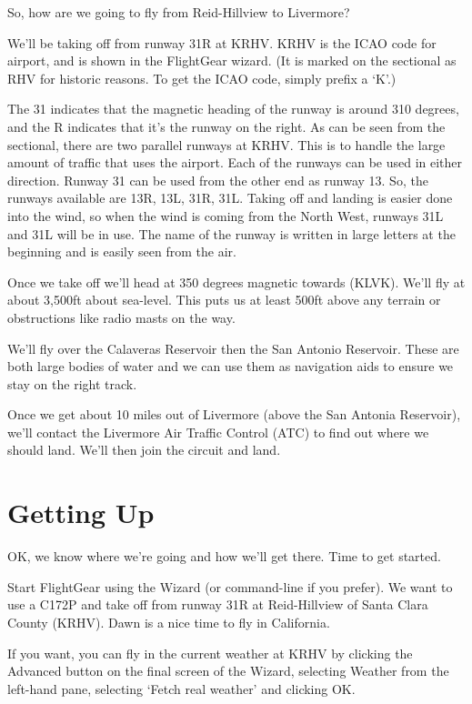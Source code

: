 So, how are we going to fly from Reid-Hillview to Livermore?

We'll be taking off from runway 31R at KRHV. KRHV is the ICAO code
for  airport, and is shown in the FlightGear wizard.
(It is marked on the sectional as RHV for historic reasons.
To get the ICAO code, simply prefix a `K'.)

The 31 indicates that the magnetic heading of the runway is around 310 degrees,
and the R indicates that it's the runway on the right. As can be seen from the
sectional, there are two parallel runways at KRHV. This is to handle the large
amount of traffic that uses the airport. Each of the runways can be used in
either direction. Runway 31 can be used from the other end as runway 13.
So, the runways available are 13R, 13L, 31R, 31L. Taking off and landing
is easier done into the wind, so when the wind is coming from the North West,
runways 31L and 31L will be in use. The name of the runway is written in large
letters at the beginning and is easily seen from the air.

Once we take off we'll head at 350 degrees magnetic towards  (KLVK).
We'll fly at about 3,500ft about sea-level. This puts us at least 500ft above any
terrain or obstructions like radio masts on the way.

We'll fly over the Calaveras Reservoir then the San Antonio Reservoir. These are
both large bodies of water and we can use them as navigation aids to ensure we
stay on the right track.

Once we get about 10 miles out of Livermore (above the San Antonia Reservoir),
we'll contact the Livermore Air Traffic Control (ATC) to find out
where we should land. We'll then join the circuit and land.

\section{Getting Up}

OK, we know where we're going and how we'll get there. Time to get started.

Start FlightGear using the Wizard (or command-line if you prefer).
 We want to use a C172P and take off from runway 31R at Reid-Hillview of
 Santa Clara County (KRHV). Dawn is a nice time to fly in California.

If you want, you can fly in the current weather at KRHV by clicking the
Advanced button on the final screen of the Wizard, selecting Weather
from the left-hand pane, selecting `Fetch real weather' and clicking OK.

